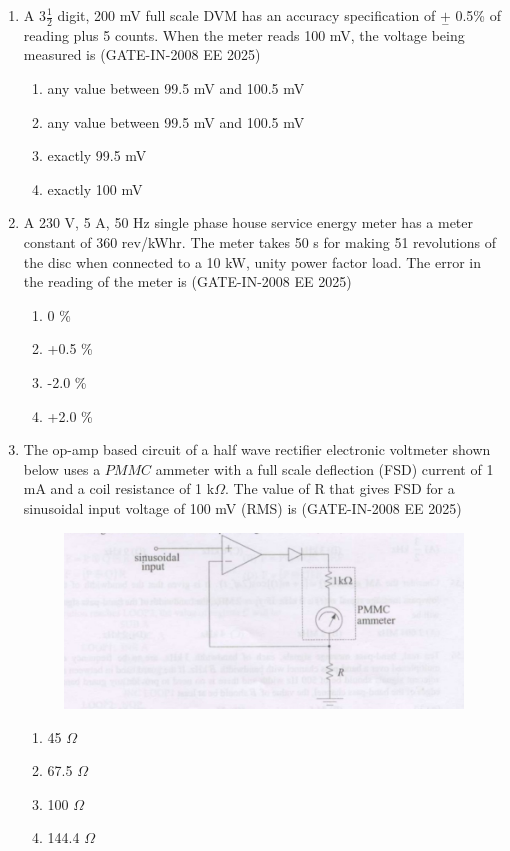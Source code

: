 \documentclass[journal,12pt,onecolumn]{IEEEtran}
\theoremstyle{remark}
\begin{document}
\begin{enumerate}[label=Q.\arabic*,start=1]
\item  A 3$\frac{1}{2}$ digit, 200 mV full scale DVM has an accuracy specification of $\underset{-}{+}$ 0.5\%  of reading plus 5
counts. When the meter reads 100 mV, the voltage being measured is (GATE-IN-2008 EE 2025)
           \begin{enumerate} 
              \item any value between 99.5 mV and 100.5 mV 
              \item any value between 99.5 mV and 100.5 mV
              \item exactly 99.5 mV
              \item exactly 100 mV
           \end{enumerate}

\item  A 230 V, 5 A, 50 Hz single phase house service energy meter has a meter constant of
360 rev/kWhr. The meter takes 50 s for making 51 revolutions of the disc when connected to a
10 kW, unity power factor load. The error in the reading of the meter is (GATE-IN-2008 EE 2025)
           \begin{enumerate} 
              \item 0 \%          
              \item +0.5 \%
              \item -2.0 \%
              \item +2.0 \%
            \end{enumerate}             
 
\item  The op-amp based circuit of a half wave rectifier electronic voltmeter shown below uses a $PMMC$ 
ammeter with a full scale deflection (FSD) current of 1 mA and a coil resistance of 1 k$\Omega$. The value
of R that gives FSD for a sinusoidal input voltage of 100 mV (RMS) is (GATE-IN-2008 EE 2025)
\begin{figure}[H]
    \centering
    \includegraphics[width=0.5\linewidth]{figs/i24.jpg}
    \label{fig:placeholder24}
\end{figure}
           \begin{enumerate} 
              \item 45 $\Omega$   
              \item 67.5 $\Omega$
              \item 100 $\Omega$
              \item 144.4 $\Omega$
            \end{enumerate}


\end{enumerate}
\end{document}
